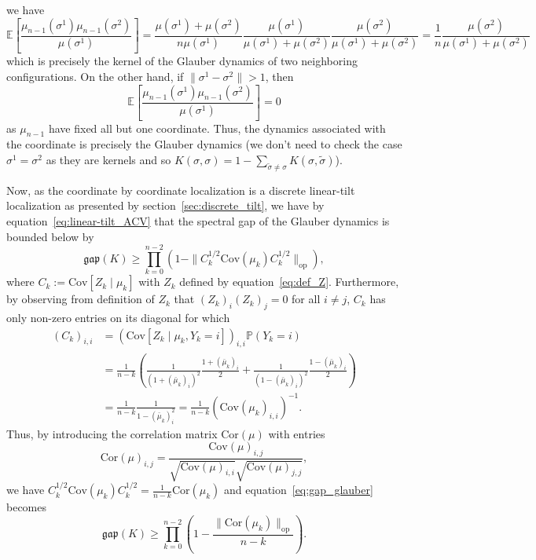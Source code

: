 we have 
\[\mathbb{E}\left[\frac{\mu_{n - 1}(\sigma^1)\mu_{n - 1}(\sigma^2)}{\mu(\sigma^1)}\right] =
  \frac{\mu(\sigma^1) + \mu(\sigma^2)}{n\mu(\sigma^1)}
  \frac{\mu(\sigma^1)}{\mu(\sigma^1) + \mu(\sigma^2)} 
  \frac{\mu(\sigma^2)}{\mu(\sigma^1) + \mu(\sigma^2)} = 
  \frac{1}{n} \frac{\mu(\sigma^2)}{\mu(\sigma^1) + \mu(\sigma^2)}\]
which is precisely the kernel of the Glauber dynamics of two neighboring configurations. 
On the other hand, if \(\|\sigma^1 - \sigma^2\| > 1\), then 
\[\mathbb{E}\left[\frac{\mu_{n - 1}(\sigma^1)\mu_{n - 1}(\sigma^2)}{\mu(\sigma^1)}\right] = 0\] 
as \(\mu_{n - 1}\) have fixed all but one coordinate. Thus, the dynamics associated with the coordinate 
is precisely the Glauber dynamics (we don't need to check the case \(\sigma^1 = \sigma^2\) as they are 
kernels and so \(K(\sigma, \sigma) = 1 - \sum_{\tilde \sigma \neq \sigma}K(\sigma, \tilde \sigma)\)).

Now, as the coordinate by coordinate localization is a discrete linear-tilt localization as presented 
by section~\ref{sec:discrete_tilt}, we have by equation~\eqref{eq:linear-tilt_ACV} that the spectral gap of 
the Glauber dynamics is bounded below by
\begin{equation}\label{eq:gap_glauber}
  \mathfrak{gap}(K) \ge \prod_{k = 0}^{n - 2} (1 - \|C_k^{1 / 2} \text{Cov}(\mu_k) C_k^{1 / 2}\|_{\text{op}}),
\end{equation}
where \(C_k := \text{Cov}[Z_k \mid \mu_k]\) with \(Z_k\) defined by equation~\eqref{eq:def_Z}. Furthermore, 
by observing from definition of \(Z_k\) that \((Z_k)_i (Z_k)_j = 0\) for all \(i \neq j\), 
\(C_k\) has only non-zero entries on its diagonal for which 
\begin{align*}
  (C_k)_{i, i} &= (\text{Cov}[Z_k \mid \mu_k, Y_k = i])_{i, i} \mathbb{P}(Y_k = i)\\
  & = \frac{1}{n - k}\left(\frac{1}{(1 + (\bar{\mu}_k)_i)^2}\frac{1 + (\bar{\mu}_k)_i}{2} + 
    \frac{1}{(1 - (\bar{\mu}_k)_i)^2}\frac{1 - (\bar{\mu}_k)_i}{2}\right)\\
  & = \frac{1}{n - k}\frac{1}{1 - (\bar{\mu}_k)_i^2} 
    = \frac{1}{n - k}(\text{Cov}(\mu_k)_{i, i})^{-1}.
\end{align*}
Thus, by introducing the correlation matrix \(\text{Cor}(\mu)\) with entries 
\[\text{Cor}(\mu)_{i, j} = \frac{\text{Cov}(\mu)_{i, j}}{\sqrt{\text{Cov}(\mu)_{i, i}}\sqrt{\text{Cov}(\mu)_{j, j}}},\]
we have \(C_k^{1 / 2} \text{Cov}(\mu_k) C_k^{1 / 2} = \frac{1}{n - k}\text{Cor}(\mu_k)\) and 
equation~\eqref{eq:gap_glauber} becomes
\begin{equation}
  \mathfrak{gap}(K) \ge \prod_{k = 0}^{n - 2} \left(1 - \frac{\|\text{Cor}(\mu_k)\|_{\text{op}}}{n - k}\right).
\end{equation}

